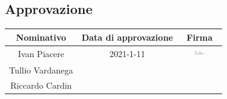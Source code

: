 \subsection{Approvazione}
\begin{table}[H]
	\centering
	\renewcommand{\arraystretch}{1.5}
	\begin{tabular}{|c|c|c|}
		\hline
		\rowcolor{lighter-grayer}
		Nominativo & Data di approvazione & Firma \\
		\hline
		Ivan Piacere & 2021-1-11 & \includegraphics[width=0.3\textwidth, height=5mm]{res/images/firma5}\\ 
		\hline
		Tullio Vardanega & & \\
		\hline
		Riccardo Cardin & & \\
		\hline
	\end{tabular}
\end{table}
